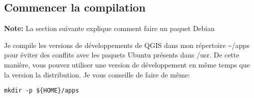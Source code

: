 % 
% 
% 
% 
% 
% 
% 
% 

\subsection{Commencer la compilation}
\textbf{Note:} La section suivante explique comment faire un paquet Debian

Je compile les versions de d\'eveloppements de QGIS dans mon r\'epertoire \~{}/apps pour \'eviter des conflits avec les paquets Ubuntu pr\'esents dans /usr. De cette mani\`ere, vous pouvez utiliser une version de d\'eveloppement en m\^eme temps que la version la distribution. Je vous conseille de faire de m\^eme:

\begin{verbatim}
mkdir -p ${HOME}/apps 
\end{verbatim}


